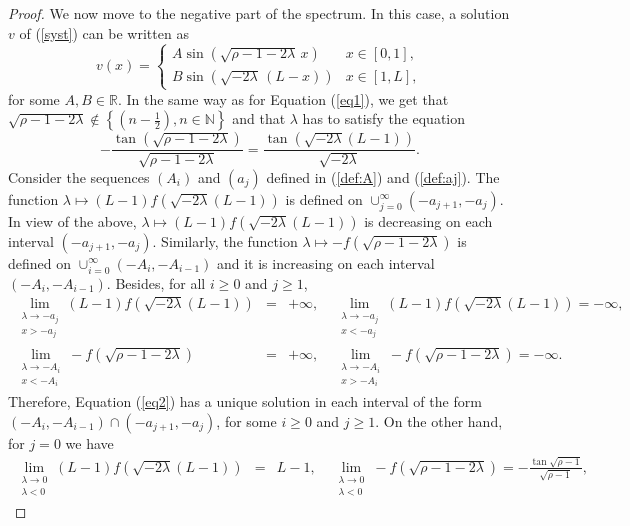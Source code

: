\documentclass[11pt]{article}
\theoremstyle{plain}
\begin{document}
\begin{proof}
 
We now move to the negative part of the spectrum. In this case, a solution $v$ of (\ref{syst}) can be written as $$  v(x)=\begin{cases}
         A\sin\left(\sqrt{\rho-1-2\lambda}\,x\right)& x\in [0,1], \\
         B\sin\left(\sqrt{-2\lambda}\,(L-x)\right) &x\in[1,L],
    \end{cases}$$
   for some $A,B\in\mathbb{R}$.
In the same way as for Equation (\ref{eq1}), we get that $\sqrt{\rho-1-2\lambda}\notin \left\{\left(n-\frac{1}{2}\right),n\in \mathbb{N}\right\}$ and that  $\lambda$ has to satisfy the equation
\begin{equation}
    -\frac{\tan(\sqrt{\rho-1-2\lambda})}{\sqrt{\rho-1-2\lambda}}=\frac{\tan(\sqrt{-2\lambda}(L-1))}{\sqrt{-2\lambda}}.
    \label{eq2}
\end{equation}
Consider the sequences $(A_i)$ and $(a_j)$ defined in (\ref{def:A}) and (\ref{def:aj}). The function $\lambda\mapsto (L-1)f(\sqrt{-2\lambda}(L-1))$ is defined on $\cup_{j=0}^\infty(-a_{j+1},-a_j)$. In view of the above, $\lambda\mapsto (L-1)f(\sqrt{-2\lambda}(L-1))$ is decreasing on each interval $(-a_{j+1},-a_j)$. Similarly, the function $\lambda\mapsto -f(\sqrt{\rho-1-2\lambda})$ is defined on $\cup_{i=0}^\infty(-A_i,-A_{i-1})$ and it is increasing on each interval $(-A_i,-A_{i-1})$. Besides, for all $i\geqslant 0$ and $j\geqslant1$, 
\begin{eqnarray}\label{lim1}
\lim\limits_{\substack{\lambda \rightarrow -a_{j} \\ x>-a_{j}}} (L-1)f(\sqrt{-2\lambda}(L-1))&=& +\infty,  \quad
\lim\limits_{\substack{\lambda \rightarrow -a_{j} \\ x<-a_{j}}} (L-1)f(\sqrt{-2\lambda}(L-1))= -\infty,\\
\lim\limits_{\substack{\lambda \rightarrow -A_{i} \\ x<-A_{i}}} -f(\sqrt{\rho-1-2\lambda})&=& +\infty,
\quad \lim\limits_{\substack{\lambda \rightarrow -A_{i} \\ x>-A_{i}}} -f(\sqrt{\rho-1-2\lambda})= -\infty. \label{lim2}
 \end{eqnarray}
Therefore,
Equation (\ref{eq2}) has a unique solution in each interval of the form $(-A_i,-A_{i-1})\cap(-a_{j+1},-a_{j})$, for some $i\geqslant 0$ and  $j\geqslant 1$. On the other hand, for $j=0$ we have 
 \begin{eqnarray}
\lim\limits_{\substack{\lambda \rightarrow 0\\ \lambda<0}} (L-1)f(\sqrt{-2\lambda}(L-1)) &=&L-1, \quad
\lim\limits_{\substack{\lambda \rightarrow 0\\ \lambda<0}} -f(\sqrt{\rho-1-2\lambda}) =-\frac{\tan\sqrt{\rho-1}}{\sqrt{\rho-1}}, \label{lim3}

\end{eqnarray}
\end{proof}
\end{document}
